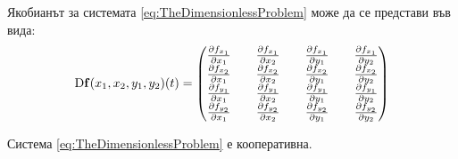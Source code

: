 
Якобианът за системата \ref{eq:TheDimensionlessProblem} може да се представи във вида:
\begin{equation}
  \mathrm{D} \mathbf{f}(x_1, x_2, y_1, y_2)(t) =
  \begin{pmatrix}
    \pdv{f_{x_1}}{x_1} && \pdv{f_{x_1}}{x_2} && \pdv{f_{x_1}}{y_1} && \pdv{f_{x_1}}{y_2} \\
    \pdv{f_{x_2}}{x_1} && \pdv{f_{x_2}}{x_2} && \pdv{f_{x_2}}{y_1} && \pdv{f_{x_2}}{y_2} \\
    \pdv{f_{y_1}}{x_1} && \pdv{f_{y_1}}{x_2} && \pdv{f_{y_1}}{y_1} && \pdv{f_{y_1}}{y_2} \\
    \pdv{f_{y_2}}{x_1} && \pdv{f_{y_2}}{x_2} && \pdv{f_{y_2}}{y_1} && \pdv{f_{y_2}}{y_2}
  \end{pmatrix}
  \end{equation}

\begin{proposition}
  Система \ref{eq:TheDimensionlessProblem} е кооперативна.
\end{proposition}

